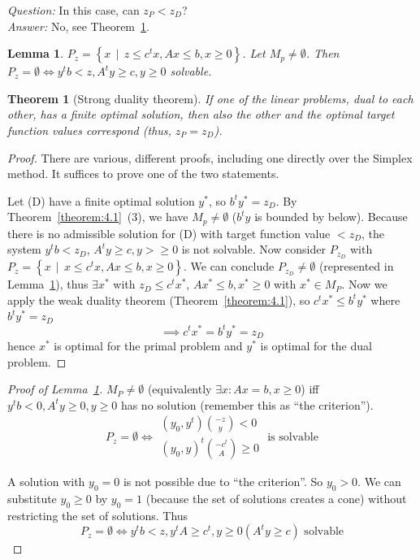 \documentclass[a4paper]{article}
\newcounter{lecref}[subsection]
\numberwithin{lecref}{subsection}
\newtheorem{theorem}[lecref]{Theorem}
\newtheorem{lemma}[lecref]{Lemma}
\newcommand{\SetDef}[2]{\left\{#1\,\mid\,#2\right\}}
\begin{document}
\emph{Question:} In this case, can $z_P < z_D$? \\
\emph{Answer:} No, see Theorem~\ref{theorem:4.5}.

\begin{lemma}
	\label{lemma:4.6}
	$P_z = \SetDef{x}{z \leq c^t x, Ax \leq b, x \geq 0}$.
	Let $M_p \neq \emptyset$. Then $P_z = \emptyset \iff y^t b < z, A^t y \geq c, y \geq 0$ solvable.
\end{lemma}

\begin{theorem}[Strong duality theorem]
	\label{theorem:4.5}
	If one of the linear problems, dual to each other, has a finite optimal solution, then also the other and the optimal target function values correspond (thus, $z_P = z_D$).
\end{theorem}

\begin{proof}
	There are various, different proofs, including one directly over the Simplex method.
	It suffices to prove one of the two statements.

	Let (D) have a finite optimal solution $y^*$, so $b^t y^* = z_D$.
	By Theorem~\ref{theorem:4.1}~(3), we have $M_p \neq \emptyset$ ($b^t y$ is bounded by below).
	Because there is no admissible solution for (D) with target function value $< z_D$, the system $y^t b < z_D$, $A^t y \geq c, y > \geq 0$ is not solvable.
	Now consider $P_{z_D}$ with $P_z = \SetDef{x}{x \leq c^t x, Ax \leq b, x \geq 0}$.
	We can conclude $P_{z_D} \neq \emptyset$ (represented in Lemma~\ref{lemma:4.6}), thus $\exists x^*$ with $z_D \leq c^t x^*$, $Ax^* \leq b, x^* \geq 0$ with $x^* \in M_P$.
	Now we apply the weak duality theorem (Theorem~\ref{theorem:4.1}), so $c^t x^* \leq b^t y^*$ where $b^t y^* = z_D$
	\[ \implies c^t x^* = b^t y^* = z_D \]
	hence $x^*$ is optimal for the primal problem and $y^*$ is optimal for the dual problem.
\end{proof}

\begin{proof}[Proof of Lemma~\ref{lemma:4.6}]
	$M_P \neq \emptyset$ (equivalently $\exists x: Ax = b, x \geq 0$) iff $y^t b < 0, A^t y \geq 0, y \geq 0$ has no solution (remember this as \enquote{the criterion}).
	\[ P_z = \emptyset \iff \begin{array}{c} (y_0, y^t) {-z \choose y} < 0 \\ (y_0, y)^t {-c^t \choose A} \geq 0 \end{array} \text{ is solvable} \]

	A solution with $y_0 = 0$ is not possible due to \enquote{the criterion}.
	So $y_0 > 0$. We can substitute $y_0 \geq 0$ by $y_0 = 1$ (because the set of solutions creates a cone) without restricting the set of solutions.
	Thus
	\[ P_z = \emptyset \iff y^t b < z, y^t A \geq c^t, y \geq 0 (A^t y \geq c) \text{ solvable} \]
\end{proof}
\end{document}
